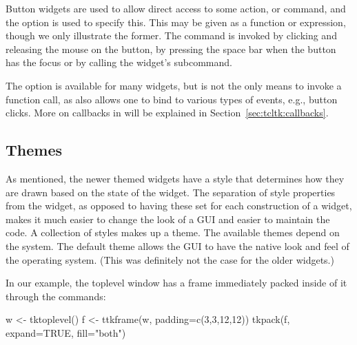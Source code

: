 Button widgets are used to allow direct access to some action, or
command, and the  option is used to specify this. This
may be given as a function or expression, though we only illustrate
the former. The command is invoked by clicking and releasing the mouse
on the button, by pressing the space bar when the button has the focus
or by calling the widget's 
subcommand. 

The  option is available for many widgets, but is not
the only means to invoke a function call, as \Tk{} also allows one to
bind to various types of events, e.g., button clicks.  More on
callbacks in  will be explained in
Section~\ref{sec:tcltk:callbacks}.




\subsection{Themes}
\label{sec:tcltk:overview:themes}


As mentioned, the newer themed widgets have a style that determines
how they are drawn based on the state of the widget. The separation of
style properties from the widget, as opposed to having these set for
each construction of a widget, makes it much easier to change the look
of a GUI and easier to maintain the code. A collection of styles makes
up a theme. The available themes depend on the system. The default
theme allows the GUI to have the native look and feel of the operating
system. (This was definitely not the case for the older \TK\/
widgets.)

In our example, the toplevel window has a frame immediately packed
inside of it through the commands:
\begin{Schunk}
\begin{Sinput}
 w <- tktoplevel()
 f <- ttkframe(w, padding=c(3,3,12,12))
 tkpack(f, expand=TRUE, fill="both")
\end{Sinput}
\end{Schunk}

